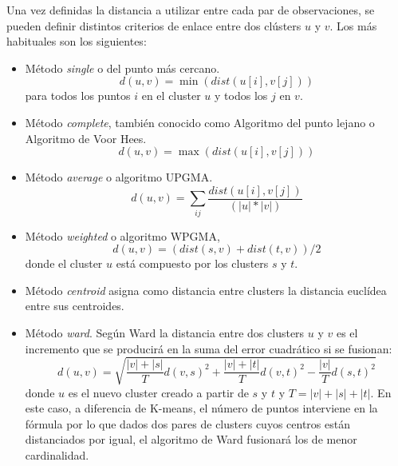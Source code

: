 Una vez definidas la distancia a utilizar entre cada par de observaciones, se pueden definir distintos criterios de enlace entre dos clústers $u$ y $v$. Los más habituales son los siguientes:
\begin{itemize}
\item Método \textit{single} o del punto más cercano. 
    \begin{equation}
    d(u,v) = \min{(dist(u[i], v[j]))} \nonumber
    \end{equation}
para todos los puntos $i$ en el cluster $u$ y todos los $j$ en $v$.
\item Método \textit{complete}, también conocido como Algoritmo del punto lejano o Algoritmo de Voor Hees.
    \begin{equation}
    d(u,v) = \max{(dist(u[i], v[j]))} \nonumber
    \end{equation}
\item Método \textit{average} o algoritmo UPGMA.
    \begin{equation}
    d(u,v) = \sum_{ij}\frac{\displaystyle dist(u[i], v[j])}{(|u| * |v|)} \nonumber
    \end{equation}
\item Método \textit{weighted} o algoritmo WPGMA,
    \begin{equation}
    d(u,v) = (dist(s,v) + dist(t,v))/2
    \end{equation}
donde el cluster $u$ está compuesto por los clusters $s$ y $t$.
\item Método \textit{centroid} asigna como distancia entre clusters la distancia euclídea entre sus centroides.
\item Método \textit{ward}. Según Ward la distancia entre dos clusters $u$ y $v$ es el incremento que se producirá en la suma del error cuadrático si se fusionan:
    \begin{equation}
    d(u,v) = \sqrt{\frac{|v|+|s|}{T}d(v,s)^2 + \frac{|v|+|t|}{T}d(v,t)^2 - \frac{|v|}{T}d(s,t)^2}
    \end{equation}
donde $u$ es el nuevo cluster creado a partir de $s$ y $t$ y $T=|v|+|s|+|t|$. En este caso, a diferencia de K-means, el número de puntos interviene en la fórmula por lo que dados dos pares de clusters cuyos centros están distanciados por igual, el algoritmo de Ward fusionará los de menor cardinalidad.
\end{itemize}
